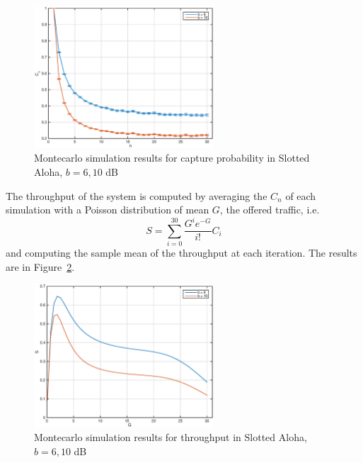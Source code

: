 \documentclass[10pt]{article}
\begin{document}
\begin{figure}[h!]
  \centering
  \includegraphics[width = 0.6\textwidth]{aloha_monte}
  \caption{Montecarlo simulation results for capture probability in Slotted Aloha, $b = 6, 10$ dB}
  \label{fig:aloha_monte}
\end{figure}

The throughput of the system is computed by averaging the $C_n$ of each simulation with a Poisson distribution of mean $G$, the offered traffic, i.e.
\begin{equation}
  S = \sum_{i = 0}^{30} \frac{G^{i} e^{-G}}{i!} C_i 
  \label{eq:aloha_S}
\end{equation}
and computing the sample mean of the throughput at each iteration. The results are in Figure~\ref{fig:aloha_monte_S}.

\begin{figure}[h!]
  \centering
  \includegraphics[width = 0.6\textwidth]{aloha_monte_S}
  \caption{Montecarlo simulation results for throughput in Slotted Aloha, $b = 6, 10$ dB}
  \label{fig:aloha_monte_S}
\end{figure}
\end{document}
